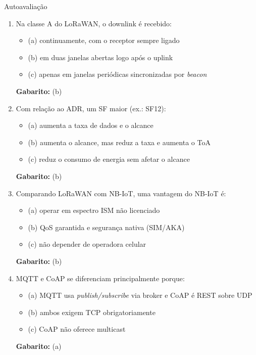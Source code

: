 \documentclass[aspectratio=169,11pt]{beamer}
\begin{document}
\begin{frame}{Autoavaliação}
  \begin{enumerate}
    \item Na classe A do LoRaWAN, o downlink é recebido:
      \begin{itemize}
        \item (a) continuamente, com o receptor sempre ligado
        \item (b) em duas janelas abertas logo após o uplink
        \item (c) apenas em janelas periódicas sincronizadas por \emph{beacon}
      \end{itemize}
      \pause
      \textbf{Gabarito:} (b)
    \item Com relação ao ADR, um SF maior (ex.: SF12):
      \begin{itemize}
        \item (a) aumenta a taxa de dados e o alcance
        \item (b) aumenta o alcance, mas reduz a taxa e aumenta o ToA
        \item (c) reduz o consumo de energia sem afetar o alcance
      \end{itemize}
      \pause
      \textbf{Gabarito:} (b)
    \item Comparando LoRaWAN com NB-IoT, uma vantagem do NB-IoT é:
      \begin{itemize}
        \item (a) operar em espectro ISM não licenciado
        \item (b) QoS garantida e segurança nativa (SIM/AKA)
        \item (c) não depender de operadora celular
      \end{itemize}
      \pause
      \textbf{Gabarito:} (b)
    \item MQTT e CoAP se diferenciam principalmente porque:
      \begin{itemize}
        \item (a) MQTT usa \emph{publish/subscribe} via broker e CoAP é REST sobre UDP
        \item (b) ambos exigem TCP obrigatoriamente
        \item (c) CoAP não oferece multicast
      \end{itemize}
      \pause
      \textbf{Gabarito:} (a)
  \end{enumerate}
\end{frame}
\end{document}
